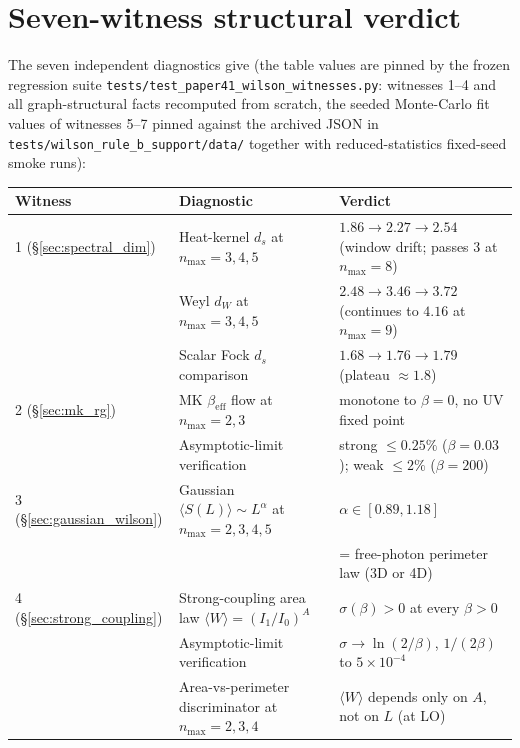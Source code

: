 \documentclass[11pt]{article}
\begin{document}
\section{Seven-witness structural verdict}
\label{sec:seven_witness}

The seven independent diagnostics give (the table values are pinned by the
frozen regression suite \texttt{tests/test\_paper41\_wilson\_witnesses.py}:
witnesses 1--4 and all graph-structural facts recomputed from scratch, the
seeded Monte-Carlo fit values of witnesses 5--7 pinned against the archived
JSON in \texttt{tests/wilson\_rule\_b\_support/data/} together with
reduced-statistics fixed-seed smoke runs):

\begin{center}
\begin{tabular}{lll}
\toprule
Witness & Diagnostic & Verdict \\
\midrule
1 (\S\ref{sec:spectral_dim}) & Heat-kernel $d_s$ at $n_\text{max}=3,4,5$ &
  $1.86\to 2.27\to 2.54$ (window drift; passes 3 at $n_\text{max}=8$) \\
  & Weyl $d_W$ at $n_\text{max}=3,4,5$ &
  $2.48\to 3.46\to 3.72$ (continues to $4.16$ at $n_\text{max}=9$) \\
  & Scalar Fock $d_s$ comparison &
  $1.68\to 1.76\to 1.79$ (plateau $\approx 1.8$) \\
\midrule
2 (\S\ref{sec:mk_rg}) & MK $\beta_\text{eff}$ flow at $n_\text{max}=2,3$ &
  monotone to $\beta=0$, no UV fixed point \\
  & Asymptotic-limit verification &
  strong $\le 0.25\%$ ($\beta{=}0.03$); weak $\le 2\%$ ($\beta{=}200$) \\
\midrule
3 (\S\ref{sec:gaussian_wilson}) & Gaussian $\langle S(L)\rangle\sim L^\alpha$
  at $n_\text{max}=2,3,4,5$ & $\alpha\in[0.89,1.18]$ \\
  &  & = free-photon perimeter law (3D or 4D) \\
\midrule
4 (\S\ref{sec:strong_coupling}) & Strong-coupling area law $\langle W\rangle=(I_1/I_0)^A$ &
  $\sigma(\beta)>0$ at every $\beta>0$ \\
  & Asymptotic-limit verification &
  $\sigma\to\ln(2/\beta)$, $1/(2\beta)$ to $5\times 10^{-4}$ \\
  & Area-vs-perimeter discriminator at $n_\text{max}=2,3,4$ &
  $\langle W\rangle$ depends only on $A$, not on $L$ (at LO) \\

\end{tabular}
\end{center}
\end{document}
